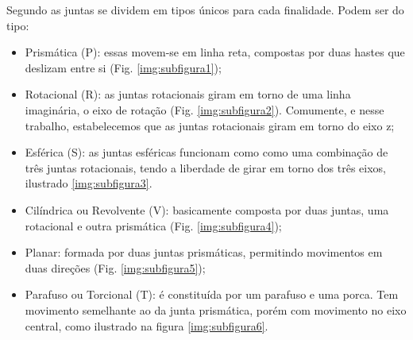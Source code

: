 Segundo \cite{Santos2004} as juntas se dividem em tipos únicos para cada finalidade. Podem ser do tipo:
\begin{itemize}
	\item Prismática (P): essas movem-se em linha reta, compostas por duas hastes que
	deslizam entre si (Fig. \ref{img:subfigura1});
        
	\item Rotacional (R): as juntas rotacionais giram em torno de uma linha imaginária, o eixo
	de rotação (Fig. \ref{img:subfigura2}). Comumente, e nesse trabalho,
	estabelecemos que as juntas rotacionais giram em torno do eixo z;

	\item Esférica (S): as juntas esféricas funcionam como como uma combinação de três juntas
	rotacionais, tendo a liberdade de girar em torno dos três eixos, ilustrado \ref{img:subfigura3}.

	\item Cilíndrica ou Revolvente (V): basicamente composta por duas juntas, uma rotacional
	e outra prismática (Fig. \ref{img:subfigura4});

	\item Planar: formada por duas juntas prismáticas, permitindo movimentos em duas
	direções (Fig. \ref{img:subfigura5});

	\item Parafuso ou Torcional (T): é constituída por um parafuso e uma porca. Tem
	movimento semelhante ao da junta prismática, porém com movimento no eixo
	central, como ilustrado na figura \ref{img:subfigura6}.		\

\end{itemize}

